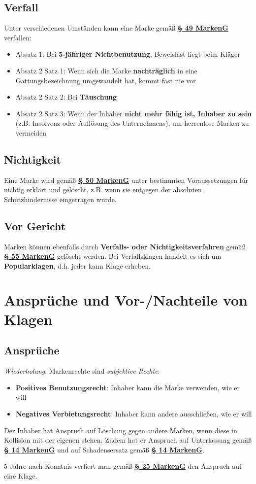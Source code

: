 \documentclass[12pt,A4]{extarticle}
\newcommand{\highlight}[1]{\textcolor{highlightColor}{\textbf{#1}}}
\newcommand{\markenG}[2][]{\textbf{\textcolor{markenGesetzLink}{\href{https://www.gesetze-im-internet.de/markeng/__#2.html}{§ #2 \ifthenelse{\equal{#1}{}}{}{#1 }MarkenG}}}}
\begin{document}
\subsection{Verfall}
Unter verschiedenen Umständen kann eine Marke gemäß \markenG{49} verfallen:
\begin{itemize}
  \item{Absatz 1: Bei \textbf{5-jähriger Nichtbenutzung}, Beweislast liegt beim Kläger}
  \item{Absatz 2 Satz 1: Wenn sich die Marke \textbf{nachträglich} in eine Gattungsbezeichnung umgewandelt hat, kommt fast nie vor}
  \item{Absatz 2 Satz 2: Bei \textbf{Täuschung}}
  \item{Absatz 2 Satz 3: Wenn der Inhaber \textbf{nicht mehr fähig ist, Inhaber zu sein} (z.B. Insolvenz oder Auflösung des Unternehmens), um herrenlose Marken zu vermeiden}
\end{itemize}

\subsection{Nichtigkeit}
Eine Marke wird gemäß \markenG{50} unter bestimmten Voraussetzungen für nichtig erklärt und gelöscht, z.B. wenn sie entgegen der absoluten Schutzhindernisse eingetragen wurde.

\subsection{Vor Gericht}
Marken können ebenfalls durch \textbf{Verfalls- oder Nichtigkeitsverfahren} gemäß \markenG{55} gelöscht werden. Bei Verfallsklagen handelt es sich um \highlight{Popularklagen}, d.h. jeder kann Klage erheben.

\section{Ansprüche und Vor-/Nachteile von Klagen}
\subsection{Ansprüche}
\textit{Wiederholung}: Markenrechte sind \textit{subjektive Rechte}:
\begin{itemize}
  \item{\textbf{Positives Benutzungsrecht}: Inhaber kann die Marke verwenden, wie er will}
  \item{\textbf{Negatives Verbietungsrecht}: Inhaber kann andere ausschließen, wie er will}
\end{itemize}
Der Inhaber hat Anspruch auf Löschung gegen andere Marken, wenn diese in Kollision mit der eigenen stehen. Zudem hat er Anspruch auf Unterlassung gemäß \markenG[Abs. 2]{14} und auf Schadensersatz gemäß \markenG[Abs. 6]{14}.\par
5 Jahre nach Kenntnis verliert man gemäß \markenG{25} den Anspruch auf eine Klage.
\end{document}
